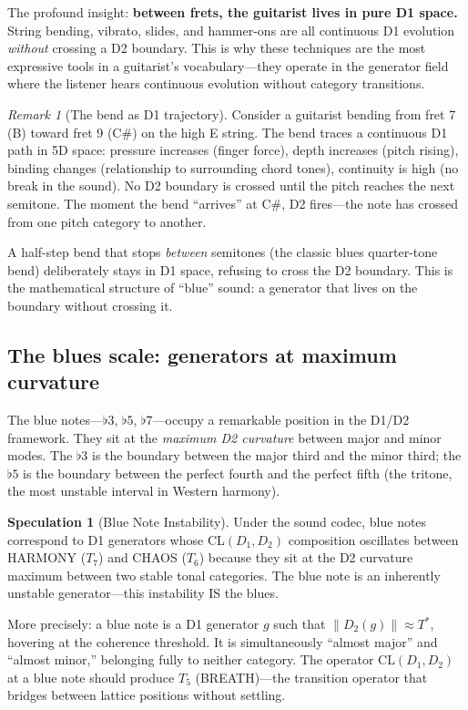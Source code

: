 \documentclass[11pt]{article}
\theoremstyle{definition}
\newtheorem{speculation}[theorem]{Speculation}
\theoremstyle{remark}
\newtheorem{remark}[theorem]{Remark}
\begin{document}
The profound insight: \textbf{between frets, the guitarist lives in pure D1 space.}
String bending, vibrato, slides, and hammer-ons are all continuous D1 evolution
\emph{without} crossing a D2 boundary.  This is why these techniques are the most
expressive tools in a guitarist's vocabulary---they operate in the generator field
where the listener hears continuous evolution without category transitions.

\begin{remark}[The bend as D1 trajectory]
Consider a guitarist bending from fret 7 (B) toward fret 9 (C\#) on the high E string.
The bend traces a continuous D1 path in 5D space: pressure increases (finger force),
depth increases (pitch rising), binding changes (relationship to surrounding chord tones),
continuity is high (no break in the sound).  No D2 boundary is crossed until the pitch
reaches the next semitone.  The moment the bend ``arrives'' at C\#, D2 fires---the
note has crossed from one pitch category to another.

A half-step bend that stops \emph{between} semitones (the classic blues quarter-tone
bend) deliberately stays in D1 space, refusing to cross the D2 boundary.  This is
the mathematical structure of ``blue'' sound: a generator that lives on the boundary
without crossing it.
\end{remark}

\subsection{The blues scale: generators at maximum curvature}

The blue notes---$\flat 3$, $\flat 5$, $\flat 7$---occupy a remarkable position in the
D1/D2 framework.  They sit at the \emph{maximum D2 curvature} between major and minor
modes.  The $\flat 3$ is the boundary between the major third and the minor third; the
$\flat 5$ is the boundary between the perfect fourth and the perfect fifth (the tritone,
the most unstable interval in Western harmony).

\begin{speculation}[Blue Note Instability]
\label{spec:blues}
Under the sound codec, blue notes correspond to D1 generators whose CL$(D_1, D_2)$
composition oscillates between HARMONY ($T_7$) and CHAOS ($T_6$) because they sit at
the D2 curvature maximum between two stable tonal categories.  The blue note is an
inherently unstable generator---this instability IS the blues.

More precisely: a blue note is a D1 generator $g$ such that $\|D_2(g)\| \approx T^*$,
hovering at the coherence threshold.  It is simultaneously ``almost major'' and ``almost
minor,'' belonging fully to neither category.  The operator $\mathrm{CL}(D_1, D_2)$ at
a blue note should produce $T_5$ (BREATH)---the transition operator that bridges
between lattice positions without settling.
\end{speculation}
\end{document}

